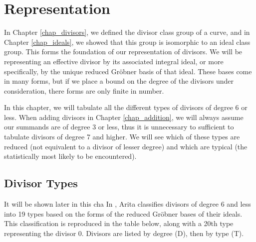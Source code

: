 
\section{Representation}
\label{chap_representation}

In Chapter \ref{chap_divisors}, we defined the divisor class group of a curve,
and in Chapter \ref{chap_ideals}, we showed that this group is isomorphic to an ideal class group.
This forms the foundation of our representation of divisors.
We will be representing an effective divisor by its associated integral ideal,
or more specifically, by the unique reduced Gr\"obner basis of that ideal.
These bases come in many forms, but if we place a bound on the degree of the divisors under consideration,
there forms are only finite in number.

In this chapter, we will tabulate all the different types of divisors of degree 6 or less.
When adding divisors in Chapter \ref{chap_addition},
we will always assume our summands are of degree 3 or less,
thus it is unnecessary to sufficient to tabulate divisors of degree 7 and higher.
We will see which of these types are reduced (not equivalent to a divisor of lesser degree)
and which are typical (the statistically most likely to be encountered).




\subsection{Divisor Types}

It will be shown later in this cha
In \cite{arita05-2}, Arita classifies divisors of degree 6 and less into 19 types
based on the forms of the reduced Gr\"obner bases of their ideals.
This classification is reproduced in the table below,
along with a 20th type representing the divisor 0.
Divisors are listed by degree (D), then by type (T).

